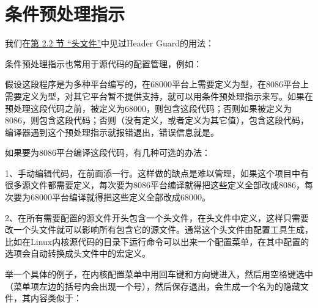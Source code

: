 
\section{条件预处理指示}
%
我们在\hyperlink{db.ch20s02.id2788051}{第 2.\BookSplit{}2 节 “头文件”}中见过Header Guard的用法：




条件预处理指示也常用于源代码的配置管理，例如：




假设这段程序是为多种平台编写的，在68000平台上需要定义为型，在8086平台上需要定义为型，对其它平台暂不提供支持，就可以用条件预处理指示来写。如果在预处理这段代码之前，被定义为68000，则包含这段代码；否则如果被定义为8086，则包含这段代码；否则（没有定义，或者定义为其它值），包含这段代码，编译器遇到这个预处理指示就报错退出，错误信息就是。



如果要为8086平台编译这段代码，有几种可选的办法：



1、手动编辑代码，在前面添一行。这样做的缺点是难以管理，如果这个项目中有很多源文件都需要定义，每次要为8086平台编译就得把这些定义全部改成8086，每次要为68000平台编译就得把这些定义全部改成68000。



2、在所有需要配置的源文件开头包含一个头文件，在头文件中定义，这样只需要改一个头文件就可以影响所有包含它的源文件。通常这个头文件由配置工具生成，比如在Linux内核源代码的目录下运行命令可以出来一个配置菜单，在其中配置的选项会自动转换成头文件中的宏定义。



举一个具体的例子，在内核配置菜单中用回车键和方向键进入，然后用空格键选中（菜单项左边的\BookCode{[\BookSplit{} ]\BookSplit{}}括号内会出现一个\BookCode{*}号），然后保存退出，会生成一个名为的隐藏文件，其内容类似于：


